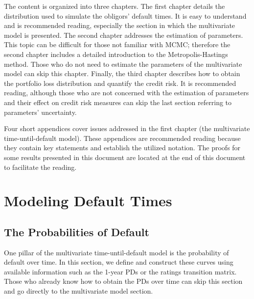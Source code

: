 \documentclass[11pt,fleqn]{book} %
\begin{document}
The content is organized into three chapters. The first chapter details the 
distribution used to simulate the obligors' default times. It is easy to 
understand and is recommended reading, especially the section in which the 
multivariate model is presented. The second chapter addresses the estimation 
of parameters. This topic can be difficult for those not familiar with MCMC; 
therefore the second chapter includes a detailed introduction to the 
Metropolis-Hastings method. Those who do not need to estimate the parameters 
of the multivariate model can skip this chapter. Finally, the 
third chapter describes how to obtain the portfolio loss distribution and 
quantify the credit risk. It is recommended reading, although those who are 
not concerned with the estimation of parameters and their effect on credit 
risk measures can skip the last section referring to parameters’ uncertainty. 

Four short appendices cover issues addressed in the first chapter (the 
multivariate time-until-default model). These appendices are recommended 
reading because they contain key statements and establish the utilized 
notation. The proofs for some results presented in this document are located 
at the end of this document to facilitate the reading.



\chapter{Modeling Default Times}
\label{chap:mdt}

\section{The Probabilities of Default}
\label{sec:pd}

One pillar of the multivariate time-until-default model is the probability 
of default over time. In this section, we define and construct these curves 
using available information such as the 1-year PDs or the ratings 
transition matrix. Those who already know how to obtain the PDs over time 
can skip this section and go directly to the multivariate model section.
\end{document}
